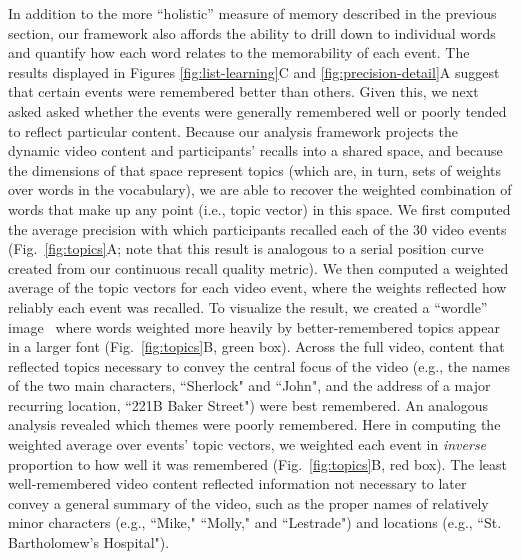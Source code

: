 \documentclass{article}
\begin{document}
In addition to the more ``holistic'' measure of memory described in the previous section, our framework also affords the ability to drill down to individual words and quantify how each word relates to the  memorability of each event. The results displayed in Figures \ref{fig:list-learning}C and \ref{fig:precision-detail}A suggest that certain events were remembered better than others.  Given this, we next asked asked whether the events were generally remembered well or poorly tended to reflect particular content.  Because our analysis framework projects the dynamic video content and participants' recalls into a shared space, and because the dimensions of that space represent topics (which are, in turn, sets of weights over words in the vocabulary), we are able to recover the weighted combination of words that make up any point (i.e., topic vector) in this space.  We first computed the average precision with which participants recalled each of the 30 video events (Fig.~\ref{fig:topics}A; note that this result is analogous to a serial position curve created from our continuous recall quality metric).  We then computed a weighted average of the topic vectors for each video event, where the weights reflected how reliably each event was recalled.  To visualize the result, we created a ``wordle'' image~\citep{MuelEtal18} where words weighted more heavily by better-remembered topics appear in a larger font (Fig.~\ref{fig:topics}B, green box).  Across the full video, content that reflected topics necessary to convey the central focus of the video (e.g., the names of the two main characters, ``Sherlock" and ``John", and the address of a major recurring location, ``221B Baker Street") were best remembered.  An analogous analysis revealed which themes were poorly remembered.  Here in computing the weighted average over events' topic vectors, we weighted each event in \textit{inverse} proportion to how well it was remembered (Fig.~\ref{fig:topics}B, red box).  The least well-remembered video content reflected information not necessary to later convey a general summary of the video, such as the proper names of relatively minor characters (e.g., ``Mike," ``Molly," and ``Lestrade") and locations (e.g., ``St. Bartholomew's Hospital").
\end{document}
